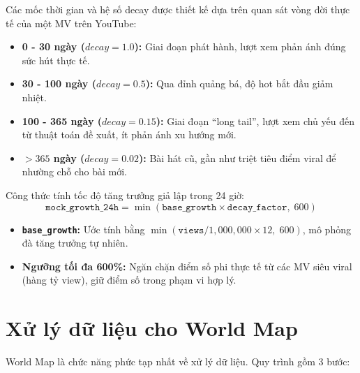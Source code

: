 \documentclass[12pt,a4paper]{report}
\begin{document}
Các mốc thời gian và hệ số decay được thiết kế dựa trên quan sát vòng đời thực tế của một MV trên YouTube:
\begin{itemize}
    \item \textbf{0 - 30 ngày ($decay = 1.0$):} Giai đoạn phát hành, lượt xem phản ánh đúng sức hút thực tế.
    \item \textbf{30 - 100 ngày ($decay = 0.5$):} Qua đỉnh quảng bá, độ hot bắt đầu giảm nhiệt.
    \item \textbf{100 - 365 ngày ($decay = 0.15$):} Giai đoạn ``long tail'', lượt xem chủ yếu đến từ thuật toán đề xuất, ít phản ánh xu hướng mới.
    \item \textbf{$> 365$ ngày ($decay = 0.02$):} Bài hát cũ, gần như triệt tiêu điểm viral để nhường chỗ cho bài mới.
\end{itemize}

Công thức tính tốc độ tăng trưởng giả lập trong 24 giờ:
\begin{equation}
\texttt{mock\_growth\_24h} = \min(\texttt{base\_growth} \times \texttt{decay\_factor},\; 600)
\label{eq:mock_growth}
\end{equation}

\begin{itemize}
    \item \textbf{\texttt{base\_growth}:} Ước tính bằng $\min(\texttt{views} / 1{,}000{,}000 \times 12,\; 600)$, mô phỏng đà tăng trưởng tự nhiên.
    \item \textbf{Ngưỡng tối đa 600\%:} Ngăn chặn điểm số phi thực tế từ các MV siêu viral (hàng tỷ view), giữ điểm số trong phạm vi hợp lý.
\end{itemize}

\section{Xử lý dữ liệu cho World Map}

World Map là chức năng phức tạp nhất về xử lý dữ liệu. Quy trình gồm 3 bước:
\end{document}

